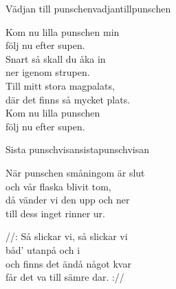 \newpage

\begin{song}{Vädjan till punschen}{vadjantillpunschen}
\begin{vers}
Kom nu lilla punschen min\\
följ nu efter supen.\\
Snart så skall du åka in\\
ner igenom strupen.\\
Till mitt stora magpalats,\\
där det finns så mycket plats.\\
Kom nu lilla punschen \\
följ nu efter supen.\\
\end{vers}
\end{song}

\begin{song}{Sista punschvisan}{sistapunschvisan}
\begin{vers}
När punschen småningom är slut\\
och vår flaska blivit tom,\\
då vänder vi den upp och ner\\
till dess inget rinner ur.\\
\end{vers}
\begin{vers}
//: Så slickar vi, så slickar vi\\
båd' utanpå och i\\
och finns det ändå något kvar\\
får det va till sämre dar. ://\\
\end{vers}
\end{song}






